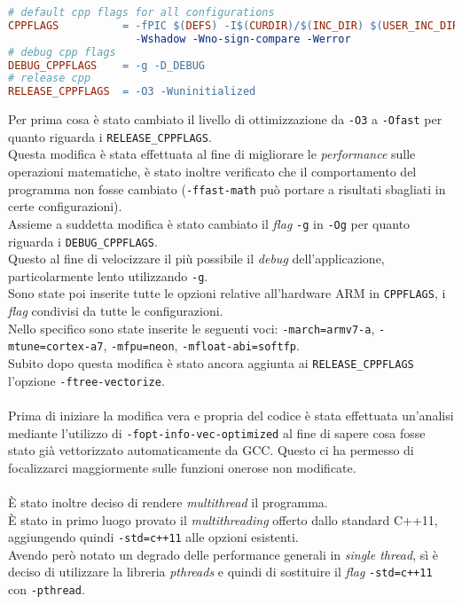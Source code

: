 \begin{lstlisting}[language=make]
# default cpp flags for all configurations
CPPFLAGS          = -fPIC $(DEFS) -I$(CURDIR)/$(INC_DIR) $(USER_INC_DIRS) -Wall
                    -Wshadow -Wno-sign-compare -Werror
# debug cpp flags
DEBUG_CPPFLAGS    = -g -D_DEBUG
# release cpp
RELEASE_CPPFLAGS  = -O3 -Wuninitialized
\end{lstlisting}

Per prima cosa è stato cambiato il livello di ottimizzazione da \verb|-O3| a 
\verb|-Ofast| per quanto riguarda i \verb|RELEASE_CPPFLAGS|.\\
Questa modifica è stata effettuata al fine di migliorare le \emph{performance} 
sulle operazioni matematiche, è stato inoltre verificato che il comportamento 
del programma non fosse cambiato (\verb|-ffast-math| può portare a risultati 
sbagliati in certe configurazioni).\\
Assieme a suddetta modifica è stato cambiato il \emph{flag} \verb|-g| in 
\verb|-Og| per quanto riguarda i \verb|DEBUG_CPPFLAGS|.\\
Questo al fine di velocizzare il più possibile il \emph{debug} 
dell'applicazione, particolarmente lento utilizzando \verb|-g|.\\
Sono state poi inserite tutte le opzioni relative all'hardware ARM in 
\verb|CPPFLAGS|, i \emph{flag} condivisi da tutte le configurazioni.\\
Nello specifico sono state inserite le seguenti voci: \verb|-march=armv7-a|, 
\verb|-mtune=cortex-a7|, \verb|-mfpu=neon|, \verb|-mfloat-abi=softfp|.\\
Subito dopo questa modifica è stato ancora aggiunta ai \verb|RELEASE_CPPFLAGS| 
l'opzione \verb|-ftree-vectorize|.\\
\\
Prima di iniziare la modifica vera e propria del codice è stata effettuata 
un'analisi mediante l'utilizzo di \verb|-fopt-info-vec-optimized| al fine di 
sapere cosa fosse stato già vettorizzato automaticamente da GCC. Questo ci ha 
permesso di focalizzarci maggiormente sulle funzioni onerose non modificate.\\
\\
\`E stato inoltre deciso di rendere \emph{multithread} il programma.\\
\`E stato in primo luogo provato il \emph{multithreading} offerto dallo 
standard 
C++11, aggiungendo quindi \verb|-std=c++11| alle opzioni esistenti.\\
Avendo però notato un degrado delle performance generali in \emph{single 
thread}, sì è deciso di utilizzare la libreria \emph{pthreads} e quindi di 
sostituire il \emph{flag} \verb|-std=c++11| con \verb|-pthread|.

